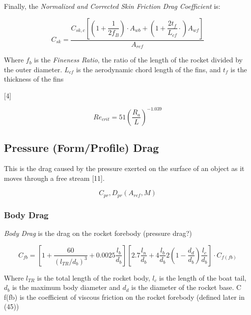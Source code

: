 \documentclass[]{book}
\begin{document}
Finally, the \emph{Normalized and Corrected Skin Friction Drag
Coefficient} is:

\begin{equation}
C_{sk} = \dfrac{ C_{sk,c} \left[ \left( 1+ \dfrac{1}{2 f_B} \right) \cdot A_{wb} + \left( 1 + \dfrac{2t_f}{L_{cf}}\cdot \right) A_{wf} \right] }{A_{ref}}
\end{equation}

Where \(f_b\) is the \emph{Fineness Ratio}, the ratio of the length of
the rocket divided by the outer diameter. \(L_{cf}\) is the aerodynamic
chord length of the fins, and \(t_f\) is the thickness of the fins

{[}4{]}

\begin{equation}
\label{eq_reynolds_critical}
Re_{crit} = 51 \left( \dfrac{R_a}{L} \right) ^{-1.039} 
\end{equation}

\subsection{Pressure (Form/Profile)
Drag}\label{pressure-formprofile-drag}

This is the drag caused by the pressure exerted on the surface of an
object as it moves through a free stream {[}11{]}.

\begin{equation} 
C_{pr}, D_{pr} (A_{ref}, M) 
\end{equation}

\subsubsection{Body Drag}\label{body-drag}

\emph{Body Drag} is the drag on the rocket forebody (pressure drag?)

\begin{equation}
\label{body_drag_coefficient}
C_{fb} = \left[ 1 + \dfrac{60}{(l_{TR}/d_b)^3} + 0.0025 \dfrac{l_b}{d_b} \right] \left[ 2.7 \dfrac{l_n}{d_b} + 4 \dfrac{l_b}{d_b} 2 \left( 1 - \dfrac{d_d}{d_b} \right) \dfrac{l_c}{d_b} \right] \cdot C_{f(fb)}
\end{equation}

Where \(l_{TR}\) is the total length of the rocket body, \(l_c\) is the
length of the boat tail, \(d_b\) is the maximum body diameter and
\(d_d\) is the diameter of the rocket base. C f(fb) is the coefficient
of viscous friction on the rocket forebody (defined later in (45))
\end{document}
